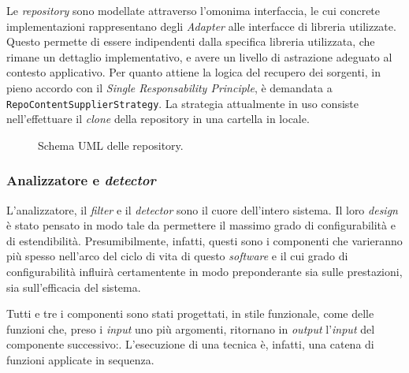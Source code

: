 Le \textit{repository} sono modellate attraverso l'omonima interfaccia, le cui concrete implementazioni rappresentano degli \textit{Adapter} \cite{gof} alle interfacce di libreria utilizzate.
%
Questo permette di essere indipendenti dalla specifica libreria utilizzata, che rimane un dettaglio implementativo, e avere un livello di astrazione adeguato al contesto applicativo.
%
Per quanto attiene la logica del recupero dei sorgenti, in pieno accordo con il \textit{Single Responsability Principle}, è demandata a \texttt{RepoContentSupplierStrategy}.
%
La strategia attualmente in uso consiste nell'effettuare il \textit{clone} della repository in una cartella in locale.

\begin{figure}[h!]
    \caption{Schema UML delle repository.}
    \label{img:02-repos}
\end{figure}

\subsubsection*{Analizzatore e \textit{detector}}
L'analizzatore, il \textit{filter} e il \textit{detector} sono il cuore dell'intero sistema.
%
Il loro \textit{design} è stato pensato in modo tale da permettere il massimo grado di configurabilità e di estendibilità.
%
Presumibilmente, infatti, questi sono i componenti che varieranno più spesso nell'arco del ciclo di vita di questo \textit{software} e il cui grado di configurabilità influirà certamentente in modo preponderante sia sulle prestazioni, sia sull'efficacia del sistema.

Tutti e tre i componenti sono stati progettati, in stile funzionale, come delle funzioni che, preso i \textit{input} uno più argomenti, ritornano in \textit{output} l'\textit{input} del componente successivo:.
%
L'esecuzione di una tecnica è, infatti, una catena di funzioni applicate in sequenza.

